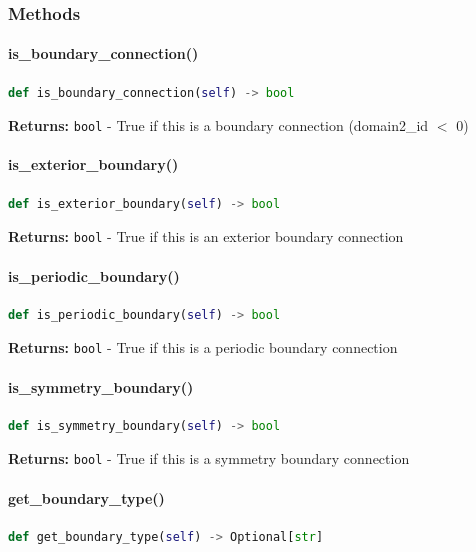 \subsubsection{Methods}

\paragraph{is\_boundary\_connection()}
\begin{lstlisting}[language=Python, caption=Check Boundary Connection]
	def is_boundary_connection(self) -> bool
\end{lstlisting}

\textbf{Returns:} \texttt{bool} - True if this is a boundary connection 
(domain2\_id $<$ 0)

\paragraph{is\_exterior\_boundary()}
\begin{lstlisting}[language=Python, caption=Check Exterior Boundary]
	def is_exterior_boundary(self) -> bool
\end{lstlisting}

\textbf{Returns:} \texttt{bool} - True if this is an exterior boundary connection

\paragraph{is\_periodic\_boundary()}
\begin{lstlisting}[language=Python, caption=Check Periodic Boundary]
	def is_periodic_boundary(self) -> bool
\end{lstlisting}

\textbf{Returns:} \texttt{bool} - True if this is a periodic boundary connection

\paragraph{is\_symmetry\_boundary()}
\begin{lstlisting}[language=Python, caption=Check Symmetry Boundary]
	def is_symmetry_boundary(self) -> bool
\end{lstlisting}

\textbf{Returns:} \texttt{bool} - True if this is a symmetry boundary connection

\paragraph{get\_boundary\_type()}
\begin{lstlisting}[language=Python, caption=Get Boundary Type]
	def get_boundary_type(self) -> Optional[str]
\end{lstlisting}

